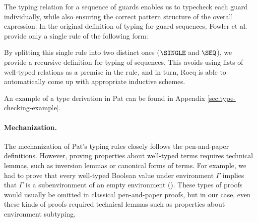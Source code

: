 The typing relation for a sequence of guards enables us to
typecheck each guard individually, while also ensuring the correct pattern
structure of the overall expression.  
In the original definition of typing for guard sequences, Fowler et al. \cite{fowlerSpecialDeliveryProgramming2023} provide only a single rule of the following form:

{\small
    \vspace{-0.5em}
\begin{center}
  \begin{prooftree}
  \end{prooftree}
\end{center}
}

By splitting this single rule into two distinct ones ($\SINGLE$ and $\SEQ$), we
provide a recursive definition for typing of sequences.  This avoids using lists
of well-typed relations as a premise in the rule, and in turn, Rocq is able to
automatically come up with appropriate inductive schemes.

\ifappendix
An example of a type derivation in Pat can be found in Appendix \ref{sec:type-checking-example}.
\fi

%

\paragraph{Mechanization.}
The mechanization of Pat's typing rules closely follows the pen-and-paper definitions.
However, proving properties about well-typed terms requires technical lemmas, such as inversion lemmas or
canonical forms of terms.
For example, we had to prove that every well-typed Boolean value under environment $\Gamma$ implies that
$\Gamma$ is a subenvironment of an empty environment ().
These types of proofs would usually be omitted in classical pen-and-paper proofs, but in our case,
even these kinds of proofs required technical lemmas such as properties about environment subtyping.
